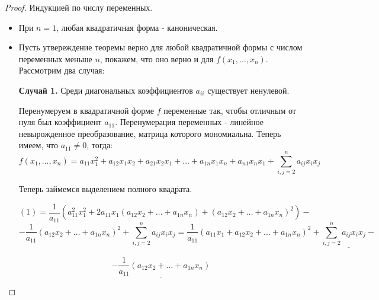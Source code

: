 \documentclass[../../main.tex]{subfiles}
\begin{document}
\begin{proof}
Индукцией по числу переменных.

\begin{itemize}
	
	\item При $n = 1$, любая квадратичная форма - каноническая.
	
	\item Пусть утвереждение теоремы верно для любой квадратичной формы с числом переменных меньше $n$, покажем, что оно верно и для $f(x_{1}, \dots, x_{n})$. Рассмотрим два случая:

	\textbf{Случай 1.} Среди диагональных коэффициентов $a_{i i}$ существует ненулевой. 

	Перенумеруем в квадратичной форме $f$ переменные так, чтобы отличным от нуля был коэффициент $a_{1 1}$. Перенумерация переменных - линейное невырожденное преобразование, матрица которого мономиальна. Теперь имеем, что $a_{1 1} \ne 0$, тогда:
	\begin{equation}
		f(x_{1}, \dots, x_{n}) = a_{1 1} x^{2}_{1} + a_{1 2} x_{1} x_{2} + a_{2 1} x_{2} x_{1} + \dots + a_{1 n} x_{1} x_{n} + a_{n 1} x_{n} x_{1} + \sum^{n}_{i, j = 2} a_{i j} x_{i} x_{j}
	\end{equation}

	Теперь займемся выделением полного квадрата.

	\[
		(1) = \frac{1}{a_{1 1}} \left( a^{2}_{1 1} x^{2}_{1} + 2 a_{1 1} x_{1} (a_{1 2} x_{2} + \dots + a_{1 n} x_{n}) + (a_{1 2}x_{2} + \dots + a_{1 n} x_{n}) ^ {2}\right) - 
	\]
	\[
		- \frac{1}{a_{1 1}}\left( a_{1 2} x_{2} + \dots + a_{1 n} x_{n}\right)^{2} + \sum^{n}_{i, j = 2} a_{i j} x_{i} x_{j} = \frac{1}{a_{1 1}} \left( a_{1 1} x_{1} + a_{1 2} x_{2} + \dots + a_{1 n} x_{n} \right) ^{2} + \underline{\sum^{n}_{i, j = 2} a_{i j}x_{i} x_{j} - }
	\]
	
	\begin{equation}
		\underline{- \frac{1}{a_{1 1}}\left( a_{1 2} x_{2} + \dots + a_{1 n} x_{n}\right)}
	\end{equation}
	

\end{itemize}
\end{proof}
\end{document}
